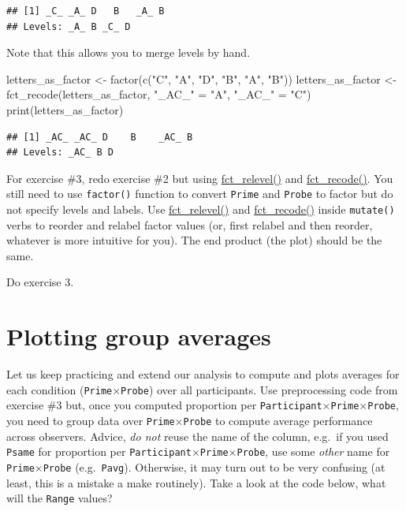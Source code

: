 \documentclass[
]{book}
\newenvironment{Shaded}{\begin{snugshade}}{\end{snugshade}}
\newcommand{\FunctionTok}[1]{\textcolor[rgb]{0.00,0.00,0.00}{#1}}
\newcommand{\NormalTok}[1]{#1}
\newcommand{\OtherTok}[1]{\textcolor[rgb]{0.56,0.35,0.01}{#1}}
\newcommand{\StringTok}[1]{\textcolor[rgb]{0.31,0.60,0.02}{#1}}
\begin{document}
\begin{verbatim}
## [1] _C_ _A_ D   B   _A_ B  
## Levels: _A_ B _C_ D
\end{verbatim}

Note that this allows you to merge levels by hand.

\begin{Shaded}
\begin{Highlighting}[]
\NormalTok{letters\_as\_factor }\OtherTok{\textless{}{-}} \FunctionTok{factor}\NormalTok{(}\FunctionTok{c}\NormalTok{(}\StringTok{"C"}\NormalTok{, }\StringTok{"A"}\NormalTok{, }\StringTok{"D"}\NormalTok{, }\StringTok{"B"}\NormalTok{, }\StringTok{"A"}\NormalTok{, }\StringTok{"B"}\NormalTok{))}
\NormalTok{letters\_as\_factor }\OtherTok{\textless{}{-}} \FunctionTok{fct\_recode}\NormalTok{(letters\_as\_factor, }\StringTok{"\_AC\_"} \OtherTok{=} \StringTok{"A"}\NormalTok{, }\StringTok{"\_AC\_"} \OtherTok{=} \StringTok{"C"}\NormalTok{)}
\FunctionTok{print}\NormalTok{(letters\_as\_factor)}
\end{Highlighting}
\end{Shaded}

\begin{verbatim}
## [1] _AC_ _AC_ D    B    _AC_ B   
## Levels: _AC_ B D
\end{verbatim}

For exercise \#3, redo exercise \#2 but using \href{https://forcats.tidyverse.org/reference/fct_relevel.html}{fct\_relevel()} and \href{https://forcats.tidyverse.org/reference/fct_recode.html}{fct\_recode()}. You still need to use \texttt{factor()} function to convert \texttt{Prime} and \texttt{Probe} to factor but do not specify levels and labels. Use \href{https://forcats.tidyverse.org/reference/fct_relevel.html}{fct\_relevel()} and \href{https://forcats.tidyverse.org/reference/fct_recode.html}{fct\_recode()} inside \texttt{mutate()} verbs to reorder and relabel factor values (or, first relabel and then reorder, whatever is more intuitive for you). The end product (the plot) should be the same.

Do exercise 3.

\hypertarget{plotting-group-averages}{%
\section{Plotting group averages}\label{plotting-group-averages}}

Let us keep practicing and extend our analysis to compute and plots averages for each condition (\texttt{Prime}×\texttt{Probe}) over all participants. Use preprocessing code from exercise \#3 but, once you computed proportion per \texttt{Participant}×\texttt{Prime}×\texttt{Probe}, you need to group data over \texttt{Prime}×\texttt{Probe} to compute average performance across observers. Advice, \emph{do not} reuse the name of the column, e.g.~if you used \texttt{Psame} for proportion per \texttt{Participant}×\texttt{Prime}×\texttt{Probe}, use some \emph{other} name for \texttt{Prime}×\texttt{Probe} (e.g.~\texttt{Pavg}). Otherwise, it may turn out to be very confusing (at least, this is a mistake a make routinely). Take a look at the code below, what will the \texttt{Range} values?
\end{document}
